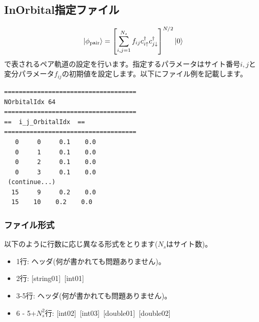 \newpage
\subsection{InOrbital指定ファイル}
\label{Subsec:InOrbital}
\begin{equation}
|\phi_{\rm pair} \rangle = \left[\sum_{i, j=1}^{N_s} f_{ij}c_{i\uparrow}^{\dag}c_{j\downarrow}^{\dag} \right]^{N/2}|0 \rangle
\end{equation}
で表されるペア軌道の設定を行います。指定するパラメータはサイト番号$i, j$と変分パラメータ$f_{ij}$の初期値を設定します。以下にファイル例を記載します。

\begin{minipage}{12.5cm}
\begin{screen}
\begin{verbatim}
====================================
NOrbitalIdx 64  
====================================
==  i_j_OrbitalIdx  ==
====================================
   0     0     0.1    0.0 
   0     1     0.1    0.0     
   0     2     0.1    0.0    
   0     3     0.1    0.0    
 (continue...)
  15     9     0.2    0.0 
  15    10    0.2    0.0 
\end{verbatim}
\end{screen}
\end{minipage}

\subsubsection{ファイル形式}
以下のように行数に応じ異なる形式をとります($N_s$はサイト数)。
 \begin{itemize}
   \item  1行:  ヘッダ(何が書かれても問題ありません)。
   \item  2行:   [string01]~[int01]
   \item  3-5行:  ヘッダ(何が書かれても問題ありません)。
   \item  6 - 5+$N_s^2$行: [int02]~[int03]~[double01]~[double02]
  \end{itemize}
